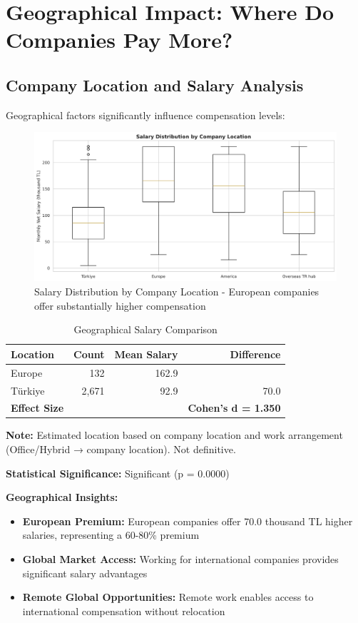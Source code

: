 \documentclass[12pt,a4paper]{article}
\begin{document}
\section{Geographical Impact: Where Do Companies Pay More?}

\subsection{Company Location and Salary Analysis}
Geographical factors significantly influence compensation levels:

\begin{figure}[H]
    \centering
    \includegraphics[width=\textwidth]{figures/boxplot_company_location.png}
    \caption{Salary Distribution by Company Location - European companies offer substantially higher compensation}
\end{figure}

\begin{table}[H]
\centering
\begin{tabular}{lrrr}
\toprule
\textbf{Location} & \textbf{Count} & \textbf{Mean Salary} & \textbf{Difference} \\
\midrule
Europe & 132 & 162.9 & \\
Türkiye & 2,671 & 92.9 & 70.0 \\
\midrule
\textbf{Effect Size} & & & \textbf{Cohen's d = 1.350} \\
\bottomrule
\end{tabular}
\caption{Geographical Salary Comparison}
\end{table}

\textbf{Note:} Estimated location based on company location and work arrangement (Office/Hybrid → company location). Not definitive.

\textbf{Statistical Significance:} Significant (p = 0.0000)

\textbf{Geographical Insights:}
\begin{itemize}
    \item \textbf{European Premium:} European companies offer 70.0 thousand TL higher salaries, representing a 60-80\% premium
    \item \textbf{Global Market Access:} Working for international companies provides significant salary advantages
    \item \textbf{Remote Global Opportunities:} Remote work enables access to international compensation without relocation
\end{itemize}
\end{document}
